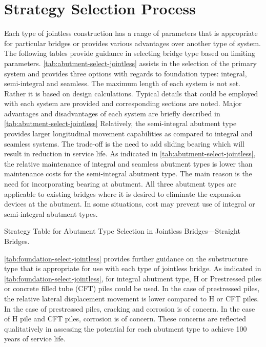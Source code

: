 \section{Strategy Selection Process}
Each type of jointless construction has a range of parameters that is appropriate for particular bridges or provides various advantages over another type of system. The following tables provide guidance in selecting bridge type based on limiting parameters. \cref{tab:abutment-select-jointless} assists in the selection of the primary system and provides three options with regards to foundation types: integral, semi-integral and seamless. The maximum length of each system is not set. Rather it is based on design calculations. Typical details that could be employed with each system are provided and corresponding sections are noted. Major advantages and disadvantages of each system are briefly described in \cref{tab:abutment-select-jointless} Relatively, the semi-integral abutment type provides larger longitudinal movement capabilities as compared to integral and seamless systems. The trade-off is the need to add sliding bearing which will result in reduction in service life. As indicated in \cref{tab:abutment-select-jointless}, the relative maintenance of integral and seamless abutment types is lower than maintenance costs for the semi-integral abutment type. The main reason is the need for incorporating bearing at abutment. All three abutment types are applicable to existing bridges where it is desired to eliminate the expansion devices at the abutment. In some situations, cost may prevent use of integral or semi-integral abutment types.

\begin{table}
  \caption{Strategy Table for Abutment Type Selection in Jointless Bridges—Straight Bridges.}
  \label{tab:abutment-select-jointless}
\end{table}

\cref{tab:foundation-select-jointless} provides further guidance on the substructure type that is appropriate for use with each type of jointless bridge. As indicated in \cref{tab:foundation-select-jointless}, for integral abutment type, H or Prestressed piles or concrete filled tube (CFT) piles could be used. In the case of prestressed piles, the relative lateral displacement movement is lower compared to H or CFT piles. In the case of prestressed piles, cracking and corrosion is of concern. In the case of H pile and CFT piles, corrosion is of concern. These concerns are reflected qualitatively in assessing the potential for each abutment type to achieve 100 years of service life.

